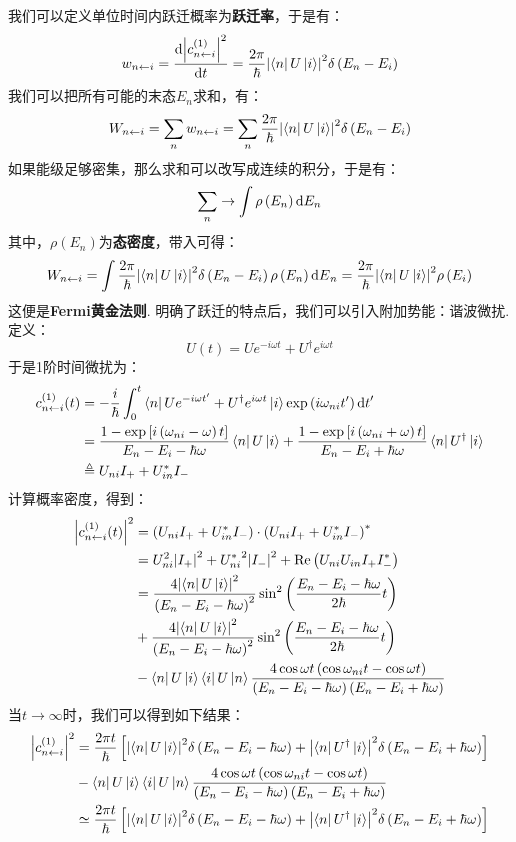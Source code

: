 我们可以定义单位时间内跃迁概率为\textbf{跃迁率}，于是有：
\[
w_{{n}\leftarrow{i}} = \frac{\mathrm{d} \abs{c_{{n}\leftarrow{i}}^{(1)}}^{2}}{\mathrm{d}t} = \frac{2\pi}{\hbar}\abs{\bra{n}U\ket{i}}^{2}\delta\left({E_{n} - E_{i}}\right)
\]
我们可以把所有可能的末态\(E_{n}\)求和，有：
\[
W_{{n}\leftarrow{i}} = \sum_{n}w_{{n}\leftarrow{i}} = \sum_{n}\frac{2\pi}{\hbar}\abs{\bra{n}U\ket{i}}^{2}\delta\left({E_{n} - E_{i}}\right)
\]
如果能级足够密集，那么求和可以改写成连续的积分，于是有：
\[
\sum_{n} \to \int\rho\left({E_{n}}\right)\dd{E_{n}}
\]
其中，\(\rho(E_{n})\)为\textbf{态密度}，带入可得：
\[
W_{{n}\leftarrow{i}} = \int\frac{2\pi}{\hbar}\abs{\bra{n}U\ket{i}}^{2}\delta\left({E_{n} - E_{i}}\right)\rho\left({E_{n}}\right)\dd{E}_{n} = \frac{2\pi}{\hbar}\abs{\bra{n}U\ket{i}}^{2}\rho\left({E_{i}}\right)
\]
这便是\textbf{Fermi黄金法则}. 明确了跃迁的特点后，我们可以引入附加势能：谐波微扰. 定义：
\[
U(t) = Ue^{-i\omega t} + U^{\dagger}e^{i\omega t}
\]
于是1阶时间微扰为：
\begin{align*}
c_{{n}\leftarrow{i}}^{(1)}(t)
& = -\frac{i}{\hbar}\int_{0}^{t}\bra{n}Ue^{-i\omega t'} + U^{\dagger}e^{i\omega t}\ket{i}\exp\left({i\omega_{ni}t'}\right)\dd{t}' \\
& = \frac{1-\exp\left[{i\left({\omega_{ni}-\omega}\right)t}\right]}{E_{n} - E_{i} - \hbar\omega}\bra{n}U\ket{i} + \frac{1-\exp\left[{i\left({\omega_{ni}+\omega}\right)t}\right]}{E_{n}-E_{i}+\hbar\omega}\bra{n}U^{\dagger}\ket{i} \\
& \triangleq U_{ni}I_{+} + U_{in}^{*}I_{-}
\end{align*}
计算概率密度，得到：
\begin{align*}
\abs{c_{{n}\leftarrow{i}}^{(1)}(t)}^{2}
& = \left({U_{ni}I_{+} + U_{in}^{*}I_{-}}\right)\cdot\left({U_{ni}I_{+} + U_{in}^{*}I_{-}}\right)^{*} \\
& = U_{ni}^{2}\abs{I_{+}}^{2} + {U_{ni}^{*}}^{2}\abs{I_{-}}^{2} + \mathrm{Re}\left({U_{ni}U_{in}I_{+}I_{-}^{*}}\right) \\
& = \frac{4\abs{\bra{n}U\ket{i}}^{2}}{\left({E_{n}-E_{i}-\hbar\omega}\right)^{2}}\sin^{2}\left({\frac{E_{n}-E_{i}-\hbar\omega}{2\hbar}t}\right) \\
& + \frac{4\abs{\bra{n}U\ket{i}}^{2}}{\left({E_{n}-E_{i}-\hbar\omega}\right)^{2}}\sin^{2}\left({\frac{E_{n}-E_{i}-\hbar\omega}{2\hbar}t}\right) \\
& - \bra{n}U\ket{i}\bra{i}U\ket{n}\frac{4\cos\omega t\left({\cos\omega_{ni}t - \cos\omega t}\right)}{\left({E_{n}-E_{i}-\hbar\omega}\right)\left({E_{n}-E_{i}+\hbar\omega}\right)}
\end{align*}
当\(t\to\infty\)时，我们可以得到如下结果：
\begin{align*}
\abs{c_{{n}\leftarrow{i}}^{(1)}}^{2}
& = \frac{2\pi t}{\hbar}\left[{\abs{\bra{n}U\ket{i}}^{2}\delta\left({E_{n}-E_{i} - \hbar\omega}\right)+\abs{\bra{n}U^{\dagger}\ket{i}}^{2}\delta\left({E_{n}-E_{i}+\hbar\omega}\right)}\right] \\
& - \bra{n}U\ket{i}\bra{i}U\ket{n}\frac{4\cos\omega t\left({\cos\omega_{ni}t - \cos\omega t}\right)}{\left({E_{n}-E_{i}-\hbar\omega}\right)\left({E_{n}-E_{i}+\hbar\omega}\right)} \\
& \simeq \frac{2\pi t}{\hbar}\left[{\abs{\bra{n}U\ket{i}}^{2}\delta\left({E_{n}-E_{i} - \hbar\omega}\right)+\abs{\bra{n}U^{\dagger}\ket{i}}^{2}\delta\left({E_{n}-E_{i}+\hbar\omega}\right)}\right]
\end{align*}

